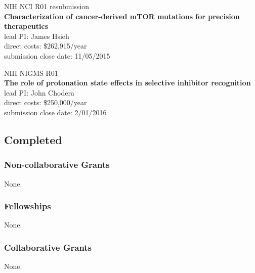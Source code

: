 \documentclass[10pt]{article}
\begin{document}
\color{red}
NIH NCI R01 resubmission\\
{\bf Characterization of cancer-derived mTOR mutations for precision therapeutics}\\
lead PI: James Hsieh\\
direct costs: \$262,915/year\\
submission close date: 11/05/2015
\color{black}

\vspace{2ex}

\color{red}
NIH NIGMS R01\\
{\bf The role of protonation state effects in selective inhibitor recognition}\\
lead PI: John Chodera\\
direct costs: \$250,000/year\\
submission close date: 2/01/2016
\color{black}


\eject
\subsection*{Completed}

\subsubsection*{Non-collaborative Grants}

None.

\subsubsection*{Fellowships}

None.

\subsubsection*{Collaborative Grants}

None.

\eject

\end{document}

